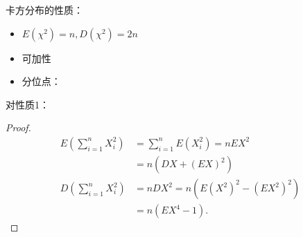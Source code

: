 卡方分布的性质：
\begin{itemize}
    \item $E\left( \chi^2 \right) =n,D\left( \chi^2 \right) =2n$
    \item 可加性
    \item 分位点：
\end{itemize}
对性质1：
\begin{proof}
    \begin{align*}
        E\left( \sum_{i=1}^{n} X_{i}^2 \right) &= \sum_{i=1}^{n} E(X_{i}^2) = nEX^2\\
                                               &=n\left( DX+\left( EX \right) ^2 \right)  \\
        D\left( \sum_{i=1}^{n} X_{i}^2 \right) &= nDX^2 =n\left( E\left( X^2 \right) ^2-\left( EX^2 \right) ^2 \right) \\
        &= n\left( EX^4-1 \right)  
    .\end{align*}
\end{proof}


